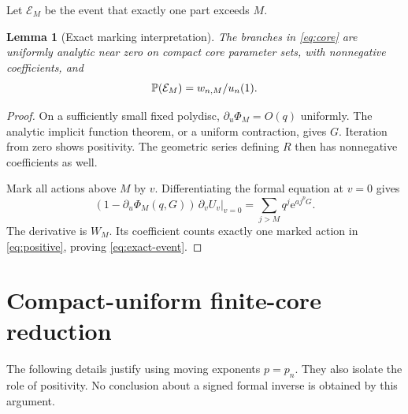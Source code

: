 \documentclass[11pt,a4paper]{article}
\numberwithin{equation}{section}
\newtheorem{lemma}[theorem]{Lemma}
\theoremstyle{definition}
\theoremstyle{remark}
\newcommand{\ee}{\mathrm e}\newcommand{\dd}{\mathrm d}
\begin{document}
Let $\mathcal E_M$ be the event that exactly one part exceeds $M$.
\begin{lemma}[Exact marking interpretation]
\label{lem:onetail}
The branches in \eqref{eq:core} are uniformly analytic near zero on compact
core parameter sets, with nonnegative coefficients, and
\begin{equation}
 \mathbb P(\mathcal E_M)=w_{n,M}/u_n(1).
 \label{eq:exact-event}
\end{equation}
\end{lemma}
\begin{proof}
On a sufficiently small fixed polydisc, $\partial_u\Phi_M=O(q)$ uniformly.
The analytic implicit function theorem, or a uniform contraction, gives
$G$. Iteration from zero shows positivity. The geometric series defining
$R$ then has nonnegative coefficients as well.

Mark all actions above $M$ by $v$. Differentiating the formal equation at
$v=0$ gives
\[
 (1-\partial_u\Phi_M(q,G))\,\partial_vU_v|_{v=0}
   =\sum_{j>M}q^j\ee^{a j^pG}.
\]
The derivative is $W_M$. Its coefficient counts exactly one marked action
in \eqref{eq:positive}, proving \eqref{eq:exact-event}.
\end{proof}

\section{Compact-uniform finite-core reduction}
\label{sec:uniform}
The following details justify using moving exponents $p=p_n$. They also
isolate the role of positivity. No conclusion about a signed formal inverse
is obtained by this argument.
\end{document}
